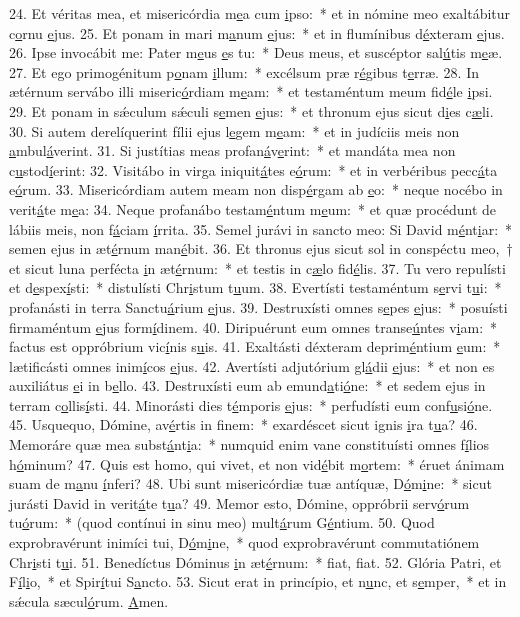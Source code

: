 24. Et véritas mea, et misericórdia m\uline{e}a cum \uline{i}pso:~* et in nómine meo exaltábitur c\uline{o}rnu \uline{e}jus.
25. Et ponam in mari m\uline{a}num \uline{e}jus:~* et in flumínibus d\uline{é}xteram \uline{e}jus.
26. Ipse invocábit me: Pater m\uline{e}us \uline{e}s tu:~* Deus meus, et suscéptor sal\uline{ú}tis m\uline{e}æ.
27. Et ego primogénitum p\uline{o}nam \uline{i}llum:~* excélsum præ r\uline{é}gibus t\uline{e}rræ.
28. In ætérnum servábo illi miseric\uline{ó}rdiam m\uline{e}am:~* et testaméntum meum fid\uline{é}le \uline{i}psi.
29. Et ponam in sǽculum sǽculi s\uline{e}men \uline{e}jus:~* et thronum ejus sicut d\uline{i}es c\uline{æ}li.
30. Si autem derelíquerint fílii ejus l\uline{e}gem m\uline{e}am:~* et in judíciis meis non \uline{a}mbul\uline{á}verint.
31. Si justítias meas profan\uline{á}v\uline{e}rint:~* et mandáta mea non c\uline{u}stod\uline{í}erint:
32. Visitábo in virga iniquit\uline{á}tes e\uline{ó}rum:~* et in verbéribus pecc\uline{á}ta e\uline{ó}rum.
33. Misericórdiam autem meam non disp\uline{é}rgam ab \uline{e}o:~* neque nocébo in verit\uline{á}te m\uline{e}a:
34. Neque profanábo testam\uline{é}ntum m\uline{e}um:~* et quæ procédunt de lábiis meis, non f\uline{á}ciam \uline{í}rrita.
35. Semel jurávi in sancto meo: Si David m\uline{é}nt\uline{i}ar:~* semen ejus in æt\uline{é}rnum man\uline{é}bit.
36. Et thronus ejus sicut sol in conspéctu meo,~† et sicut luna perfécta \uline{i}n æt\uline{é}rnum:~* et testis in c\uline{æ}lo fid\uline{é}lis.
37. Tu vero repulísti et d\uline{e}spex\uline{í}sti:~* distulísti Chr\uline{i}stum t\uline{u}um.
38. Evertísti testaméntum s\uline{e}rvi t\uline{u}i:~* profanásti in terra Sanctu\uline{á}rium \uline{e}jus.
39. Destruxísti omnes s\uline{e}pes \uline{e}jus:~* posuísti firmaméntum \uline{e}jus form\uline{í}dinem.
40. Diripuérunt eum omnes transe\uline{ú}ntes v\uline{i}am:~* factus est oppróbrium vic\uline{í}nis s\uline{u}is.
41. Exaltásti déxteram deprim\uline{é}ntium \uline{e}um:~* lætificásti omnes inim\uline{í}cos \uline{e}jus.
42. Avertísti adjutórium gl\uline{á}dii \uline{e}jus:~* et non es auxiliátus \uline{e}i in b\uline{e}llo.
43. Destruxísti eum ab emund\uline{a}ti\uline{ó}ne:~* et sedem ejus in terram c\uline{o}llis\uline{í}sti.
44. Minorásti dies t\uline{é}mporis \uline{e}jus:~* perfudísti eum conf\uline{u}si\uline{ó}ne.
45. Usquequo, Dómine, av\uline{é}rtis in f\uline{i}nem:~* exardéscet sicut ignis \uline{i}ra t\uline{u}a?
46. Memoráre quæ mea subst\uline{á}nt\uline{i}a:~* numquid enim vane constituísti omnes f\uline{í}lios h\uline{ó}minum?
47. Quis est homo, qui vivet, et non vid\uline{é}bit m\uline{o}rtem:~* éruet ánimam suam de m\uline{a}nu \uline{í}nferi?
48. Ubi sunt misericórdiæ tuæ antíquæ, D\uline{ó}m\uline{i}ne:~* sicut jurásti David in verit\uline{á}te t\uline{u}a?
49. Memor esto, Dómine, oppróbrii serv\uline{ó}rum tu\uline{ó}rum:~* (quod contínui in sinu meo) mult\uline{á}rum G\uline{é}ntium.
50. Quod exprobravérunt inimíci tui, D\uline{ó}m\uline{i}ne,~* quod exprobravérunt commutatiónem Chr\uline{i}sti t\uline{u}i.
51. Benedíctus Dóminus \uline{i}n æt\uline{é}rnum:~* f\uline{i}at, f\uline{i}at.
52. Glória Patri, et F\uline{í}l\uline{i}o,~* et Spir\uline{í}tui S\uline{a}ncto.
53. Sicut erat in princípio, et n\uline{u}nc, et s\uline{e}mper,~* et in sǽcula sæcul\uline{ó}rum. \uline{A}men.
